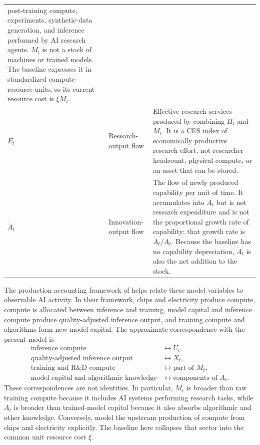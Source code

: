 \begin{table}[H]
\begin{tabular}{p{}p{}p{}}
        post-training compute, experiments, synthetic-data generation, and inference
        performed by AI research agents. $M_t$ is not a stock of machines or trained
        models. The baseline expresses it in standardized compute-resource units, so
        its current resource cost is $\xi M_t$. \\
        \addlinespace
        $E_t$
        & \raggedright Research-output flow
        & Effective research services produced by combining $H_t$ and $M_t$. It is a
        CES index of economically productive research effort, not researcher headcount,
        physical compute, or an asset that can be stored. \\
        \addlinespace
        $\dot A_t$
        & \raggedright Innovation-output flow
        & The flow of newly produced capability per unit of time. It accumulates into
        $A_t$ but is not research expenditure and is not the proportional growth rate
        of capability; that growth rate is $\dot A_t/A_t$. Because the baseline has no
        capability depreciation, $\dot A_t$ is also the net addition to the stock. \\
        \bottomrule
    \end{tabular}
\end{table}

The production-accounting framework of \citet{korinekmckelvey2026} helps relate
these model variables to observable AI activity. In their framework, chips and
electricity produce compute, compute is allocated between inference and training,
model capital and inference compute produce quality-adjusted inference output, and
training compute and algorithms form new model capital. The approximate
correspondence with the present model is
\begin{equation}
    \begin{aligned}
        \text{inference compute} &\longleftrightarrow U_t,\\
        \text{quality-adjusted inference output} &\longleftrightarrow X_t,\\
        \text{training and R\&D compute} &\longleftrightarrow
        \text{part of }M_t,\\
        \text{model capital and algorithmic knowledge} &\longleftrightarrow
        \text{components of }A_t.
    \end{aligned}
    \label{eq:korinek-mckelvey-mapping}
\end{equation}
These correspondences are not identities. In particular, $M_t$ is broader than raw
training compute because it includes AI systems performing research tasks, while
$A_t$ is broader than trained-model capital because it also absorbs algorithmic and
other knowledge. Conversely, \citet{korinekmckelvey2026} model the upstream
production of compute from chips and electricity explicitly. The baseline here
collapses that sector into the common unit resource cost $\xi$.


